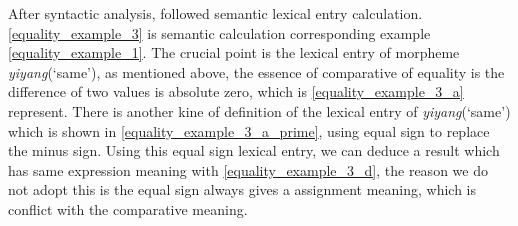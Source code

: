 \documentclass{ctexart}
\begin{document}
After syntactic analysis, followed semantic lexical entry calculation. \ref{equality_example_3} is semantic calculation corresponding example \ref{equality_example_1}. The crucial point is the lexical entry of morpheme \textit{yiyang}(`same'), as mentioned above, the essence of comparative of equality is the difference of two values is absolute zero, which is \ref{equality_example_3_a} represent. There is another kine of definition of the lexical entry of \textit{yiyang}(`same') which is shown in \ref{equality_example_3_a_prime}, using equal sign to replace the minus sign. Using this equal sign lexical entry, we can deduce a result which has same expression meaning with \ref{equality_example_3_d}, the reason we do not adopt this is the equal sign always gives a assignment meaning, which is conflict with the comparative meaning.
\end{document}
